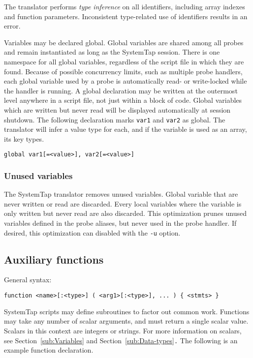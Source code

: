 \documentclass[twoside,english]{article}
\newenvironment{vindent}
{\begin{list}{}{\setlength{\listparindent}{6pt}}
\item[]}
{\end{list}}
\begin{document}
The translator performs \emph{type inference} on all identifiers, including
array indexes and function parameters. Inconsistent type-related use of identifiers
results in an error.

Variables may be declared global. Global variables are shared among all probes
and remain instantiated as long as the SystemTap session. There is one namespace
for all global variables, regardless of the script file in which they are
found. Because of possible concurrency limits, such as multiple probe handlers,
each global variable used by a probe is automatically read- or write-locked
while the handler is running. A global declaration may be written at the
outermost level anywhere in a script file, not just within a block of code.
Global variables which are written but never read will be displayed
automatically at session shutdown.  The following declaration marks
\texttt{var1} and \texttt{var2} as global.
The translator will infer a value type for each, and if the variable is used
as an array, its key types.

\begin{vindent}
\begin{verbatim}
global var1[=<value>], var2[=<value>]
\end{verbatim}
\end{vindent}

\subsubsection{Unused variables}

The SystemTap translator removes unused variables. Global variable
that are never written or read are discarded.  Every local variables
where the variable is only written but never read are also
discarded. This optimization prunes unused variables defined
in the probe aliases, but never used in the probe handler.
If desired, this optimization can disabled with the \texttt{-u} option.

\subsection{Auxiliary functions\label{sub:Auxiliary-functions}}
General syntax:

\begin{vindent}
\begin{verbatim}
function <name>[:<type>] ( <arg1>[:<type>], ... ) { <stmts> }
\end{verbatim}
\end{vindent}
SystemTap scripts may define subroutines to factor out common work. Functions
may take any number of scalar arguments, and must return a single scalar
value. Scalars in this context are integers or strings. For more information
on scalars, see Section~\ref{sub:Variables} and Section~\ref{sub:Data-types}\texttt{.}
The following is an example function declaration.
\end{document}

